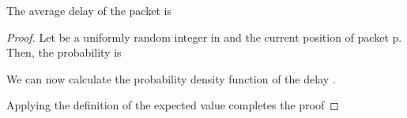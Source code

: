 \documentclass[letterpaper,10pt]{llncs}
\begin{document}
\begin{lemma}
\label{lem:delayAVG}
The average delay  of the packet is 

\end{lemma}

\begin{proof}
Let  be a uniformly random integer in 
and  the current position of packet p. Then, the probability  is




\noindent
We can now calculate the probability density function  of the delay .





 

\noindent
Applying the definition of the expected value completes the proof

\end{proof}
\end{document}
